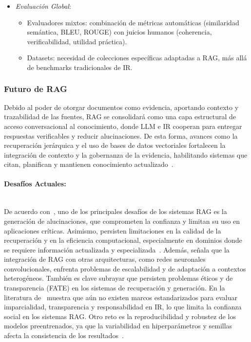 \begin{itemize}
\begin{itemize}
        \item \textit{Evaluación Global}: 
        \begin{itemize}
            \item Evaluadores mixtos: combinación de métricas automáticas (similaridad semántica, BLEU, ROUGE) con juicios humanos (coherencia, verificabilidad, utilidad práctica).
            \item Datasets: necesidad de colecciones específicas adaptadas a RAG, más allá de benchmarks tradicionales de IR.
        \end{itemize}
    \end{itemize}
    
\end{itemize}


\subsubsection{Futuro de RAG}

Debido al poder de otorgar documentos como evidencia, aportando contexto y trazabilidad de las fuentes, RAG se consolidará como una capa estructural de acceso conversacional
 al conocimiento, donde LLM e IR cooperan para entregar respuestas verificables y reducir alucinaciones. De esta forma, avances como la recuperación jerárquica y el uso de bases de datos vectoriales 
  fortalecen la integración de contexto y la gobernanza de la evidencia, habilitando sistemas que citan, planifican y mantienen 
 conocimiento actualizado~\parencite{zhai2024llmIR}. 

\paragraph{Desafíos Actuales:} 
\mbox{}\\
De acuerdo con~\textcite{zhai2024llmIR}, uno de los principales desafíos de los sistemas RAG es la generación de alucinaciones, que comprometen la confianza y 
limitan su uso en aplicaciones críticas. Asimismo, persisten limitaciones en la calidad de la recuperación y en la eficiencia computacional, especialmente 
en dominios donde se requiere información actualizada y especializada~\parencite{hu2024ragrau}. Además, \textcite{ramdurai2025llm} señala que la integración de RAG con otras
arquitecturas, como redes neuronales convolucionales, enfrenta problemas de escalabilidad y de adaptación a contextos heterogéneos. También es clave subrayar que persisten problemas éticos y de transparencia (FATE) en los sistemas de recuperación y generación.
En la literatura de~\textcite{bernard2025fate} muestra que aún no existen marcos estandarizados para evaluar imparcialidad, transparencia y responsabilidad en IR, lo que limita la confianza social en los sistemas RAG. 
Otro reto es la reproducibilidad y robustez de los modelos preentrenados, ya que la variabilidad en hiperparámetros y semillas afecta la consistencia de los resultados~\parencite{fan2021pretraining}.

